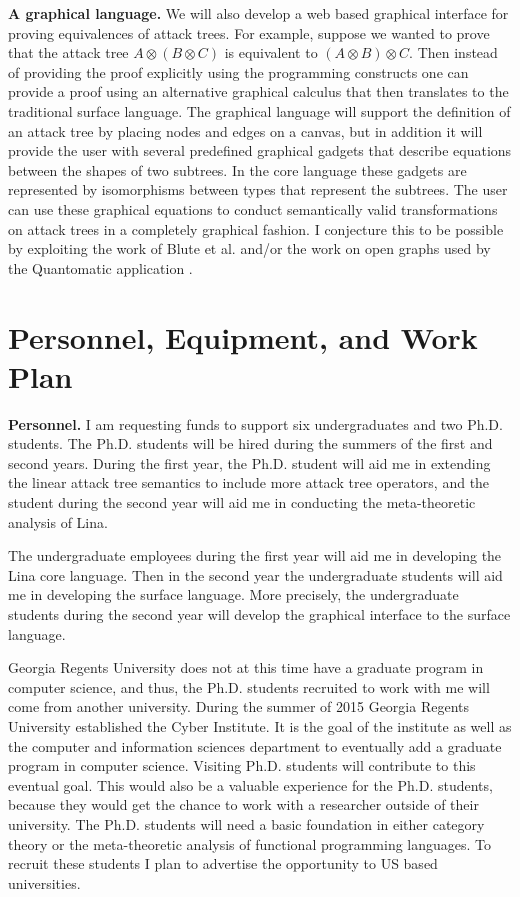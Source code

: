 \begin{full}
\textbf{A graphical language.} We will also develop a web based
graphical interface for proving equivalences of attack trees.  For
example, suppose we wanted to prove that the attack tree $A \otimes (B
\otimes C)$ is equivalent to $(A \otimes B) \otimes C$.  Then instead
of providing the proof explicitly using the programming constructs one
can provide a proof using an alternative graphical calculus that then
translates to the traditional surface language.  The graphical
language will support the definition of an attack tree by placing
nodes and edges on a canvas, but in addition it will provide the user
with several predefined graphical gadgets that describe equations
between the shapes of two subtrees.  In the core language these
gadgets are represented by isomorphisms between types that represent
the subtrees.  The user can use these graphical equations to conduct
semantically valid transformations on attack trees in a completely
graphical fashion.  I conjecture this to be possible by exploiting the
work of Blute et al. \cite{Blute:1996a} and/or the work on open graphs
used by the Quantomatic application \cite{Dixon:2011,Dixon:2010}.

\section{Personnel, Equipment, and Work Plan}
\label{sec:personnel_and_work_plan}
\textbf{Personnel.} I am requesting funds to support six
undergraduates and two Ph.D. students.  The Ph.D. students will be
hired during the summers of the first and second years.  During the
first year, the Ph.D. student will aid me in extending the linear
attack tree semantics to include more attack tree operators, and the
student during the second year will aid me in conducting the
meta-theoretic analysis of Lina.

The undergraduate employees during the first year will aid me in
developing the Lina core language.  Then in the second year the
undergraduate students will aid me in developing the surface language.
More precisely, the undergraduate students during the second year will
develop the graphical interface to the surface language.

Georgia Regents University does not at this time have a graduate
program in computer science, and thus, the Ph.D. students recruited to
work with me will come from another university.  During the summer of
2015 Georgia Regents University established the Cyber Institute.  It
is the goal of the institute as well as the computer and information
sciences department to eventually add a graduate program in computer
science.  Visiting Ph.D. students will contribute to this eventual
goal.  This would also be a valuable experience for the
Ph.D. students, because they would get the chance to work with a
researcher outside of their university.  The Ph.D. students will need
a basic foundation in either category theory or the meta-theoretic
analysis of functional programming languages.  To recruit these
students I plan to advertise the opportunity to US based universities.


\end{full}
